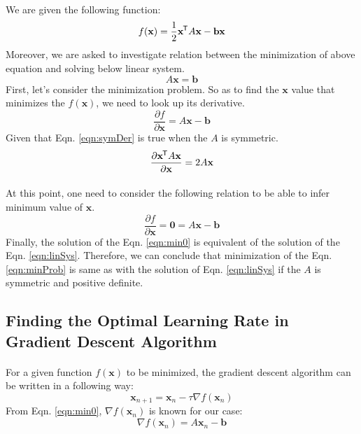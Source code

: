 \documentclass[letterpaper,12pt]{article}
\newcommand*{\tran}{^{\mkern-1.5mu\mathsf{T}}}
\begin{document}
\paragraph{} We are given the following function:
\begin{equation}
   \label{eqn:minProb}
   f(\mathbf{x}) =\frac{1}{2} \mathbf{x} \tran A \mathbf{x} - \mathbf{b} \mathbf{x}
\end{equation}
Moreover, we are asked to investigate relation between the minimization of above equation and solving below linear system.
\begin{equation}
   \label{eqn:linSys}
   A\mathbf{x} = \mathbf{b}
\end{equation}
First, let's consider the minimization problem. So as to find the $\mathbf{x}$ value that minimizes the $f(\mathbf{x})$, we need to look up its derivative.
\begin{equation*}
   \frac{\partial f}{\partial \mathbf{x}} = A\mathbf{x} - \mathbf{b}
\end{equation*}
Given that Eqn. \ref{eqn:symDer} is true when the $A$ is symmetric.
\begin{equation}
   \label{eqn:symDer}
   \frac{\partial  \mathbf{x} \tran A \mathbf{x} }{\partial \mathbf{x}} = 2A\mathbf{x}
\end{equation}
\paragraph{}At this point, one need to consider the following relation to be able to infer minimum value of $\mathbf{x}$.
\begin{equation}
   \label{eqn:min0}
   \frac{\partial f}{\partial \mathbf{x}} = \mathbf{0} = A\mathbf{x} - \mathbf{b}
\end{equation}
Finally, the solution of the Eqn. \ref{eqn:min0} is equivalent of the solution of the Eqn. \ref{eqn:linSys}. Therefore, we can conclude that minimization of the Eqn. \ref{eqn:minProb} is same as with the solution of Eqn. \ref{eqn:linSys} if the $A$ is symmetric and positive definite.

\subsection{Finding the Optimal Learning Rate in Gradient Descent Algorithm}
\paragraph{}For a given function $f(\mathbf{x})$ to be minimized, the gradient descent algorithm can be written in a following way:
\begin{equation*}
   \mathbf{x}_{n+1} = \mathbf{x}_n - \tau \nabla f(\mathbf{x}_n)
\end{equation*}
From Eqn. \ref{eqn:min0}, $\nabla f(\mathbf{x}_n)$ is known for our case:
\begin{equation*}
   \nabla f(\mathbf{x}_n) = A\mathbf{x}_n - \mathbf{b}
\end{equation*}
\end{document}
